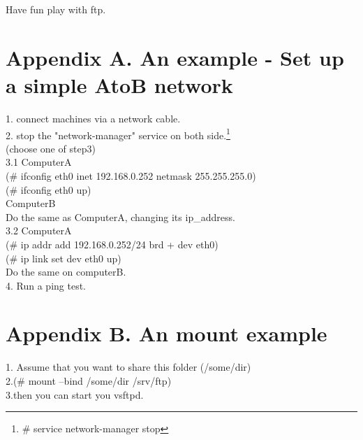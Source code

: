 \documentclass[11pt]{article}
\begin{document}
Have fun play with ftp.

\section{Appendix A. An example - Set up a simple AtoB network}

1. connect machines via a network cable.\\
2. stop the "network-manager" service on both side.\footnote{\# service network-manager stop}\\
(choose one of step3)\\
3.1 ComputerA\\
(\# ifconfig eth0 inet 192.168.0.252 netmask 255.255.255.0)\\
(\# ifconfig eth0 up)\\
ComputerB\\
Do the same as ComputerA, changing its ip\_address.\\
3.2 ComputerA\\
(\# ip addr add 192.168.0.252/24 brd + dev eth0)\\
(\# ip link set dev eth0 up)\\
Do the same on computerB.\\
4. Run a ping test.

\section{Appendix B. An mount example}
1. Assume that you want to share this folder (/some/dir)\\
2.(\# mount --bind /some/dir /srv/ftp)\\
3.then you can start you vsftpd.
\end{document}
